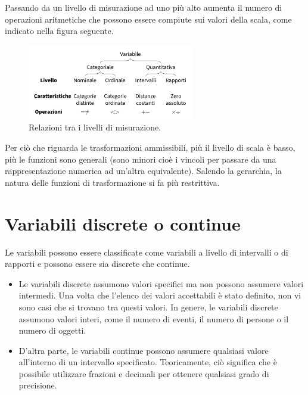 \documentclass[
  letterpaper,
  DIV=11,
  numbers=noendperiod]{scrreprt}
\providecommand{\tightlist}{%
  \setlength{\itemsep}{0pt}\setlength{\parskip}{0pt}}\usepackage{longtable,booktabs,array}
\theoremstyle{definition}
\theoremstyle{remark}
\begin{document}
Passando da un livello di misurazione ad uno più alto aumenta il numero
di operazioni aritmetiche che possono essere compiute sui valori della
scala, come indicato nella figura seguente.

\begin{figure}[H]

{\centering \includegraphics[width=0.65\textwidth,height=\textheight]{chapters/key_notions/../../figures/misurazione_1.png}

}

\caption{Relazioni tra i livelli di misurazione.}

\end{figure}%

Per ciò che riguarda le trasformazioni ammissibili, più il livello di
scala è basso, più le funzioni sono generali (sono minori cioè i vincoli
per passare da una rappresentazione numerica ad un'altra equivalente).
Salendo la gerarchia, la natura delle funzioni di trasformazione si fa
più restrittiva.

\section{Variabili discrete o
continue}\label{variabili-discrete-o-continue}

Le variabili possono essere classificate come variabili a livello di
intervalli o di rapporti e possono essere sia discrete che continue.

\begin{itemize}
\tightlist
\item
  Le variabili discrete assumono valori specifici ma non possono
  assumere valori intermedi. Una volta che l'elenco dei valori
  accettabili è stato definito, non vi sono casi che si trovano tra
  questi valori. In genere, le variabili discrete assumono valori
  interi, come il numero di eventi, il numero di persone o il numero di
  oggetti.
\item
  D'altra parte, le variabili continue possono assumere qualsiasi valore
  all'interno di un intervallo specificato. Teoricamente, ciò significa
  che è possibile utilizzare frazioni e decimali per ottenere qualsiasi
  grado di precisione.
\end{itemize}
\end{document}

